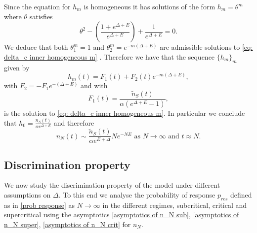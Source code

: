 \documentclass{article}
\numberwithin{equation}{section}
\theoremstyle{plain}
\begin{document}
Since the equation for $h_m $ is homogeneous it has solutions of the form $h_m= \theta^m $ where $\theta $ satisfies 
\[
\theta^2 - \left( \frac{ 1+ e^{\Delta + E } }{e^{\Delta + E }}\right) + \frac{1}{e^{\Delta + E }}=0 . 
\]
We deduce that both $\theta_1^m  = 1 $ and $\theta_2^m  = e^{-m (\Delta+ E) } $ are admissible solutions to \eqref{eq: delta_c inner homogeneous m}
. 
Therefore we have that the sequence $\{ h_m\}_{m} $ given by 
\[
h_m(t) = F_1(t) + F_2(t) e^{-m (\Delta+ E) },
\]
with $F_2=-F_1e^{- (\Delta+ E) } $ and with 
\[
F_1(t) = \frac{\tilde{n}_S (t)}{\alpha (e^{\Delta + E} - 1 ) },
\]
is the solution to \eqref{eq: delta_c inner homogeneous m}.
In particular we conclude that $h_0 = \frac{n_S (t) } {\alpha e^{\Delta + E} }$ and therefore 
\begin{equation} \label{asymptotics of n_N crit}
n_{N} (t) \sim \frac{\tilde{n}_S(t)}{\alpha e^{E+\Delta } } N e^{-N E } \text{ as } N \to \infty \text{ and } t \approx N.  
\end{equation}

\subsection{Discrimination property} \label{sec:discrimination}
We now study the discrimination property of the model under different assumptions on $\Delta$.
To this end we analyse the probability of response $p_{res} $ defined as in \eqref{prob response} as $N \to \infty $ in the different regimes, subcritical, critical and supercritical using the asymptotics \eqref{asymptotics of n_N sub}, \eqref{asymptotics of n_N super}, \eqref{asymptotics of n_N crit} for $n_N$. 
\end{document}
